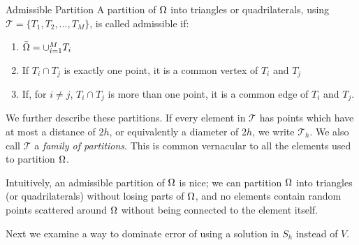 
\begin{defn}{Admissible Partition}
   A partition of $\Omega$ into triangles or quadrilaterals, using 
   $\mathcal{T} = \{T_1, T_2, \ldots, T_M \}$, is called admissible if:~\label{def:admissible_partition}
   \begin{enumerate}
    \item $ \bar{\Omega} = \cup_{i=1}^M T_i$
    \item If $T_i \cap T_j$ is exactly one point, it is a common vertex of 
    $T_i$ and $T_j$
    \item If, for $i\neq j$, $T_i \cap T_j$ is more than one point, it is a 
    common edge of $T_i$ and $T_j$.
   \end{enumerate}
\end{defn}
We further describe these partitions. If every element in $\mathcal{T}$ has points 
which have at most a distance of $2h$, or equivalently a diameter of $2h$, 
we write $\mathcal{T}_h$. We also call $\mathcal{T}$ a \emph{family of partitions}. 
This is common vernacular to all the elements used to partition $\Omega$. 

Intuitively, an admissible partition of $\Omega$ is nice; we can partition $\Omega$ 
into triangles (or quadrilaterals) without losing parts of $\Omega$, and no 
elements contain random points scattered around $\Omega$ without being connected 
to the element itself.

Next we examine a way to dominate error of using a solution in $S_h$ instead 
of $V$.